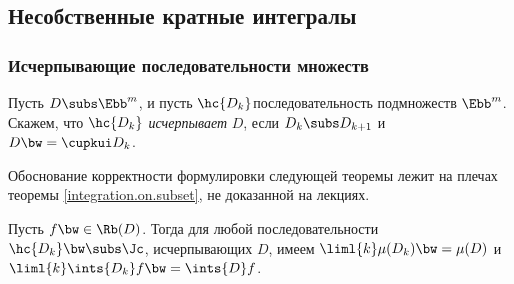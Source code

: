 \documentclass[a4paper]{article}
\begin{document}
\subsection{Несобственные кратные интегралы}

\subsubsection{Исчерпывающие последовательности множеств}

\begin{df}
Пусть $D \subs \Ebb^m$, и пусть $\hc{D_k}$\т последовательность подмножеств $\Ebb^m$. Скажем, что $\hc{D_k}$
\emph{исчерпывает} $D$, если $D_k \subs D_{k+1}$ и $D \bw= \cupkui D_k$.
\end{df}

Обоснование корректности формулировки следующей теоремы лежит на плечах теоремы \ref{integration.on.subset},
не доказанной на лекциях.
\begin{theorem}
Пусть $f \bw\in \Rb(D)$. Тогда для любой последовательности $\hc{D_k} \bw\subs \Jc$, исчерпывающих $D$, имеем
$\liml{k} \mu(D_k) \bw= \mu(D)$ и $\liml{k} \ints{D_k} f \bw= \ints{D} f$.
\end{theorem}
\end{document}
